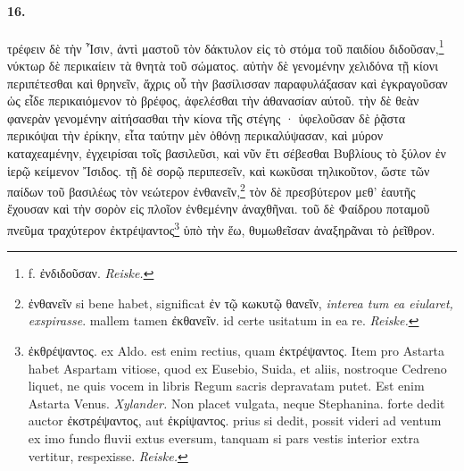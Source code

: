 \documentclass[a4paper, 11pt, oneside, polutonikogreek, german]{article}
\begin{document}
\paragraph{16.}
τρέφειν δὲ τὴν Ἶσιν, ἀντὶ μαστοῦ τὸν δάκτυλον εἰς τὸ στόμα τοῦ παιδίου διδοῦσαν,\footnote{f. ἐνδιδοῦσαν. \emph{Reiske.}} νύκτωρ δὲ περικαίειν τὰ θνητὰ τοῦ σώματος. αὐτὴν δὲ γενομένην χελιδόνα τῇ κίονι περιπέτεσθαι καὶ θρηνεῖν, ἄχρις οὗ τὴν βασίλισσαν παραφυλάξασαν καὶ ἐγκραγοῦσαν ὡς εἶδε περικαιόμενον τὸ βρέφος, ἀφελέσθαι τὴν ἀθανασίαν αὐτοῦ. τὴν δὲ θεὰν φανερὰν γενομένην αἰτήσασθαι τὴν κίονα τῆς στέγης · ὑφελοῦσαν δὲ ῥᾷστα περικόψαι τὴν ἐρίκην, εἶτα ταύτην μὲν ὀθόνῃ περικαλύψασαν, καὶ μύρον καταχεαμένην, ἐγχειρίσαι τοῖς βασιλεῦσι, καὶ νῦν ἔτι σέβεσθαι Βυβλίους τὸ ξύλον ἐν ἱερῷ κείμενον Ἴσιδος. τῇ δὲ σορῷ περιπεσεῖν, καὶ κωκῦσαι τηλικοῦτον, ὥστε τῶν παίδων τοῦ βασιλέως τὸν νεώτερον ἐνθανεῖν,\footnote{ἐνθανεῖν si bene habet, significat ἐν τῷ κωκυτῷ θανεῖν, \emph{interea tum ea eiularet, exspirasse}. mallem tamen ἐκθανεῖν. id certe usitatum in ea re. \emph{Reiske.}} τὸν δὲ πρεσβύτερον μεθ' ἑαυτῆς ἔχουσαν καὶ τὴν σορὸν εἰς πλοῖον ἐνθεμένην ἀναχθῆναι. τοῦ δὲ Φαίδρου ποταμοῦ πνεῦμα τραχύτερον ἐκτρέψαντος\footnote{ἐκθρέψαντος. ex Aldo. est enim rectius, quam ἐκτρέψαντος. Item pro Astarta habet Aspartam vitiose, quod ex Eusebio, Suida, et aliis, nostroque Cedreno liquet, ne quis vocem in libris Regum sacris depravatam putet. Est enim Astarta Venus. \emph{Xylander.} Non placet vulgata, neque Stephanina. forte dedit auctor ἐκστρέψαντος, aut ἐκρίψαντος. prius si dedit, possit videri ad ventum ex imo fundo fluvii extus eversum, tanquam si pars vestis interior extra vertitur, respexisse. \emph{Reiske.}} ὑπὸ τὴν ἕω, θυμωθεῖσαν ἀναξηρᾶναι τὸ ῥεῖθρον.
\end{document}
